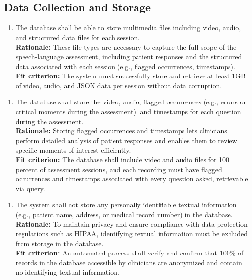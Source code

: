 \documentclass[12pt]{article}
\begin{document}
\subsection{Data Collection and Storage}
\begin{enumerate}[{FR-DSC}1. ]
  \item The database shall be able to store multimedia files including video, audio, and structured data files for each session.\\
  \textbf{Rationale: }These file types are necessary to capture the full scope of the speech-language assessment, 
  including patient responses and the structured data associated with each session (e.g., flagged occurrences, 
  timestamps).\\
  \textbf{Fit criterion: }The system must successfully store and retrieve at least 1GB of video, audio, and JSON 
  data per session without data corruption.
\end{enumerate}
\begin{enumerate}[{FR-DSC}2. ]
  \item The database shall store the video, audio, flagged occurrences (e.g., errors or critical moments
  during the assessment), and timestamps for each question during the assessment.\\
 \textbf{Rationale: }Storing flagged occurrences and timestamps lets clinicians perform detailed analysis 
 of patient responses and enables them to review specific moments of interest efficiently.\\
 \textbf{Fit criterion: }The database shall include video and audio files for 100 percent of assessment sessions,
  and each recording must have flagged occurrences and timestamps associated with every question asked, 
  retrievable via query.
\end{enumerate}
\begin{enumerate}[{FR-DSC}3. ]
  \item The system shall not store any personally identifiable textual information (e.g., patient name, address, 
  or medical record number) in the database.\\
  \textbf{Rationale: }To maintain privacy and ensure compliance with data protection regulations such as HIPAA, 
  identifying textual information must be excluded from storage in the database.\\
  \textbf{Fit criterion: }An automated process shall verify and confirm that 100\% of records in the database 
  accessible by clinicians are anonymized and contain no identifying textual information.
\end{enumerate}
\end{document}

